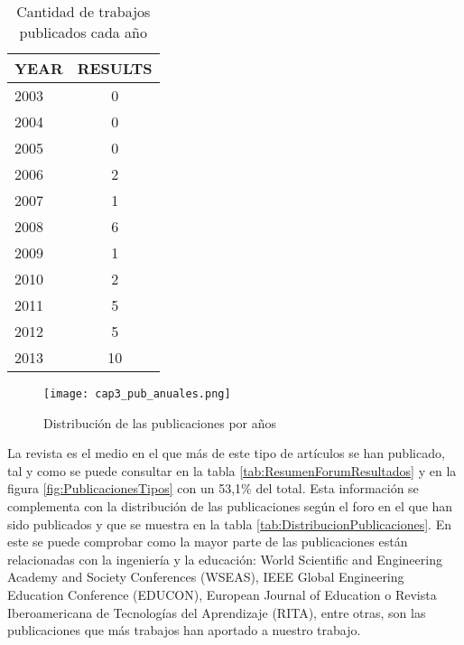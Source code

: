 \begin{table}[H]
  \begin{center}
  \begin{tabular}{| m{4cm} | c |}
    \hline
    YEAR & RESULTS\\
    \hline    
    \hline
    2003 & 0\\
    \hline
    2004 & 0\\
    \hline
    2005 & 0\\
    \hline
    2006 & 2\\
    \hline
    2007 & 1\\
    \hline
    2008 & 6\\
    \hline
    2009 & 1\\
    \hline
    2010 & 2\\
    \hline
    2011 & 5\\
    \hline
    2012 & 5\\
    \hline
    2013 & 10 \\
    \hline
  \end{tabular}
\end{center}
\caption{Cantidad de trabajos publicados cada año}
\label{tab:ResumenAniosResultados}
\end{table} 

\begin{figure}[H]
  \begin{center}
    \texttt{[image: cap3\_pub\_anuales.png]}
  \end{center}
  \caption{Distribución de las publicaciones por años}
  \label{fig:PublicacionesAnuales}
\end{figure}

La revista es el medio en el que más de este tipo de artículos se han publicado, tal y como se puede consultar en la tabla \ref{tab:ResumenForumResultados} y en la figura \ref{fig:PublicacionesTipos} con un 53,1\% del total. Esta información se complementa con la distribución de las publicaciones según el foro en el que han sido publicados y que se muestra en la tabla \ref{tab:DistribucionPublicaciones}. En este se puede comprobar como la mayor parte de las publicaciones están relacionadas con la ingeniería y la educación: World Scientific and Engineering Academy and Society Conferences (WSEAS), IEEE Global Engineering Education Conference (EDUCON), European Journal of Education o Revista Iberoamericana de Tecnologías del Aprendizaje (RITA), entre otras, son las publicaciones que más trabajos han aportado a nuestro trabajo.

